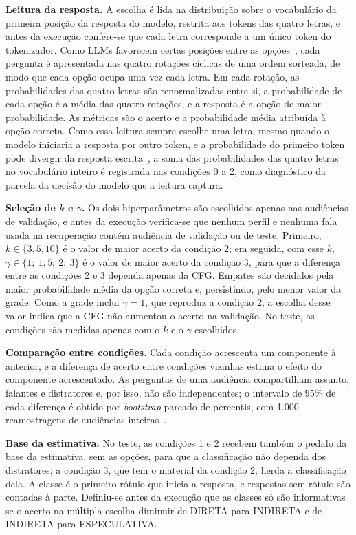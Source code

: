 \textbf{Leitura da resposta.} A escolha é lida na distribuição sobre o vocabulário da primeira
posição da resposta do modelo, restrita aos tokens das quatro letras, e antes da execução
confere-se que cada letra corresponde a um único token do tokenizador. Como LLMs favorecem certas
posições entre as opções~\citep{zheng2024large,pezeshkpour2024large}, cada pergunta é apresentada nas
quatro rotações cíclicas de uma ordem sorteada, de modo que cada opção ocupa uma vez cada letra. Em
cada rotação, as probabilidades das quatro letras são renormalizadas entre si, a probabilidade de
cada opção é a média das quatro rotações, e a resposta é a opção de maior probabilidade. As métricas
são o acerto e a probabilidade média atribuída à opção correta. Como essa leitura sempre escolhe uma
letra, mesmo quando o modelo iniciaria a resposta por outro token, e a probabilidade do primeiro
token pode divergir da resposta escrita~\citep{wang2024answer}, a soma das probabilidades das quatro
letras no vocabulário inteiro é registrada nas condições 0 a 2, como diagnóstico da parcela da
decisão do modelo que a leitura captura.

\textbf{Seleção de $k$ e $\gamma$.} Os dois hiperparâmetros são escolhidos apenas nas audiências de
validação, e antes da execução verifica-se que nenhum perfil e nenhuma fala usada na recuperação
contém audiência de validação ou de teste. Primeiro, $k \in \{3, 5, 10\}$ é o valor de maior acerto
da condição 2; em seguida, com esse $k$, $\gamma \in \{1;\ 1{,}5;\ 2;\ 3\}$ é o valor de maior acerto
da condição 3, para que a diferença entre as condições 2 e 3 dependa apenas da CFG. Empates são
decididos pela maior probabilidade média da opção correta e, persistindo, pelo menor valor da grade.
Como a grade inclui $\gamma = 1$, que reproduz a condição 2, a escolha desse valor indica que a CFG
não aumentou o acerto na validação. No teste, as condições são medidas apenas com o $k$ e o $\gamma$
escolhidos.

\textbf{Comparação entre condições.} Cada condição acrescenta um componente à anterior, e a
diferença de acerto entre condições vizinhas estima o efeito do componente acrescentado. As perguntas
de uma audiência compartilham assunto, falantes e distratores e, por isso, não são independentes; o
intervalo de 95\% de cada diferença é obtido por \textit{bootstrap} pareado de percentis, com 1.000
reamostragens de audiências inteiras~\citep{efron1993introduction}.

\textbf{Base da estimativa.} No teste, as condições 1 e 2 recebem também o pedido da base da
estimativa, sem as opções, para que a classificação não dependa dos distratores; a condição 3, que
tem o material da condição 2, herda a classificação dela. A classe é o primeiro rótulo que inicia a
resposta, e respostas sem rótulo são contadas à parte. Definiu-se antes da execução que as classes só
são informativas se o acerto na múltipla escolha diminuir de DIRETA para INDIRETA e de INDIRETA para
ESPECULATIVA.

